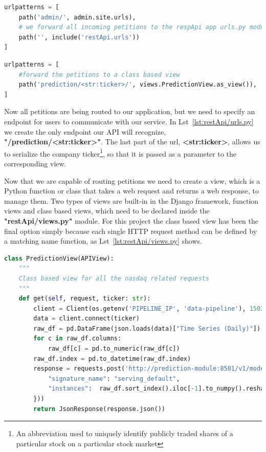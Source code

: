 \begin{lstlisting}[language=python,caption=apiGateway/urls.py,label={lst:root/urls.py}]
urlpatterns = [
    path('admin/', admin.site.urls),
    # we forward all incoming petitions to the respApi app urls.py module
    path('', include('restApi.urls')) 
]
\end{lstlisting}

\begin{lstlisting}[language=python,caption=restApi/urls.py,label={lst:restApi/urls.py}]
urlpatterns = [
    #forward the petitions to a class based view
    path('prediction/<str:ticker>/', views.PredictionView.as_view()),
]
\end{lstlisting}

Now all petitions are being routed to our application, but we need to specify an endpoint for users to communicate with our service. In Lst~\ref{lst:restApi/urls.py} we create the only endpoint our API will recognize, \textbf{"/prediction/<str:ticker>"}. The last part of the url, \textbf{<str:ticker>}, allows us to serialize the company ticker\footnote{An abbreviation used to uniquely identify publicly traded shares of a particular stock on a particular stock market}, so that it is passed as a parameter to the corresponding view.

Now that we are capable of routing petitions we need to create a view, which is a Python function or class that takes a web request and returns a web response, to manage them. Two types of views are built-in in the Django framework, function views and class based views, which need to be declared inside the \textbf{"restApi/views.py"} module. For this project the class based view has been the final option simply because each single HTTP request method can be defined by a matching name function, as Lst~\ref{lst:restApi/views.py} shows.

\begin{lstlisting}[language=python,caption=restApi/views.py,label={lst:restApi/views.py}]
class PredictionView(APIView):
    """
    Class based view for all the nasdaq related requests
    """
    def get(self, request, ticker: str):
        client = Client(os.getenv('PIPELINE_IP', 'data-pipeline'), 15032)
        data = client.connect(ticker)
        raw_df = pd.DataFrame(json.loads(data)["Time Series (Daily)"]).T
        for c in raw_df.columns:
            raw_df[c] = pd.to_numeric(raw_df[c])
        raw_df.index = pd.to_datetime(raw_df.index)
        response = requests.post('http://prediction-module:8501/v1/models/{model}:predict', data=json.dumps({
            "signature_name": "serving_default",
            "instances":  raw_df.sort_index().iloc[-1].to_numpy().reshape(1, 5).tolist()
        }))
        return JsonResponse(response.json())
\end{lstlisting}

